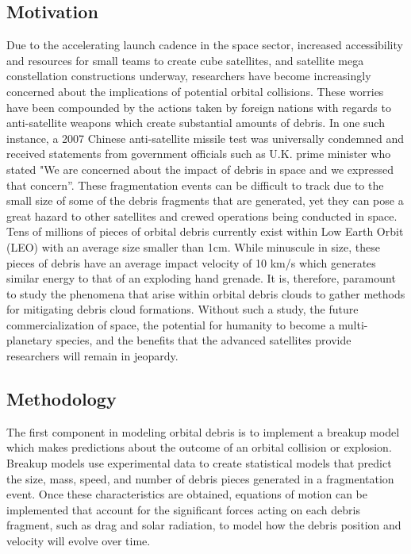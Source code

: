 \documentclass[a4paper, 12pt]{article}
\begin{document}
\subsection{Motivation}
Due to the accelerating launch cadence in the space sector, increased accessibility and resources for small teams to create cube satellites, and satellite mega constellation constructions underway, researchers have become increasingly concerned about the implications of potential orbital collisions. These worries have been compounded by the actions taken by foreign nations with regards to anti-satellite weapons which create substantial amounts of debris. In one such instance, a 2007 Chinese anti-satellite missile test was universally condemned and received statements from government officials such as U.K. prime minister who stated "We are concerned about the impact of debris in space and we expressed that concern”. These fragmentation events can be difficult to track due to the small size of some of the debris fragments that are generated, yet they can pose a great hazard to other satellites and crewed operations being conducted in space. Tens of millions of pieces of orbital debris currently exist within Low Earth Orbit (LEO) with an average size smaller than 1cm. While minuscule in size, these pieces of debris have an average impact velocity of 10 km/s which generates similar energy to that of an exploding hand grenade. It is, therefore, paramount to study the phenomena that arise within orbital debris clouds to gather methods for mitigating debris cloud formations. Without such a study, the future commercialization of space, the potential for humanity to become a multi-planetary species, and the benefits that the advanced satellites provide researchers will remain in jeopardy.%
\subsection{Methodology}
The first component in modeling orbital debris is to implement a breakup model which makes predictions about the outcome of an orbital collision or explosion. Breakup models use experimental data to create statistical models that predict the size, mass, speed, and number of debris pieces generated in a fragmentation event. Once these characteristics are obtained, equations of motion can be implemented that account for the significant forces acting on each debris fragment, such as drag and solar radiation, to model how the debris position and velocity will evolve over time. 
\end{document}
